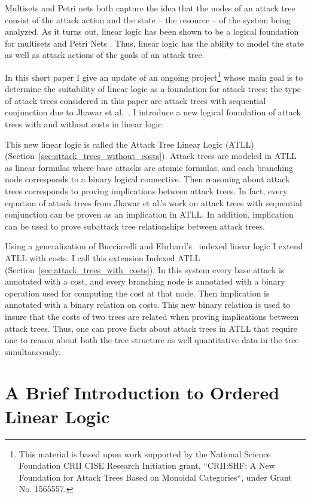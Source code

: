 \documentclass{llncs}
\begin{document}
Multisets and Petri nets both capture the idea that the nodes of an
attack tree consist of the attack action and the state -- the
resource -- of the system being analyzed. As it turns out, linear
logic has been shown to be a logical foundation for multisets
\cite{Tzouvaras:1998} and Petri Nets \cite{Brown:1991}.  Thus, linear
logic has the ability to model the state as well as attack actions of
the goals of an attack tree.  

In this short paper I give an update of an ongoing
project\footnote{This material is based upon work supported by the
  National Science Foundation CRII CISE Research Initiation grant,
  ``CRII:SHF: A New Foundation for Attack Trees Based on Monoidal
  Categories``, under Grant No. 1565557.} whose main goal is to
determine the suitability of linear logic as a foundation for attack
trees; the type of attack trees considered in this paper are attack
trees with sequential conjunction due to Jhawar et
al.~\cite{Jhawar:2015}.  I introduce a new logical foundation of
attack trees with and without costs in linear logic.

This new linear logic is called the Attack Tree Linear Logic (ATLL)
(Section~\ref{sec:attack_trees_without_costs}).  Attack trees are
modeled in ATLL as linear formulas where base attacks are atomic
formulas, and each branching node corresponds to a binary logical
connective. Then reasoning about attack trees corresponds to proving
implications between attack trees.  In fact, every equation of attack
trees from Jhawar et al.'s work on attack trees with sequential
conjunction \cite{Jhawar:2015} can be proven as an implication in
ATLL.  In addition, implication can be used to prove subattack tree
relationships between attack trees.

Using a generalization of Bucciarelli and
Ehrhard’s~\cite{BUCCIARELLI:2000} indexed linear logic I extend ATLL
with costs.  I call this extension Indexed ATLL
(Section~\ref{sec:attack_trees_with_costs}).  In this system every
base attack is annotated with a cost, and every branching node is
annotated with a binary operation used for computing the cost at that
node.  Then implication is annotated with a binary relation on costs.
This new binary relation is used to insure that the costs of two trees
are related when proving implications between attack trees.  Thus, one
can prove facts about attack trees in ATLL that require one to reason
about both the tree structure as well quantitative data in the tree
simultaneously.

\section{A Brief Introduction to Ordered Linear Logic}
\label{sec:a_brief_introduction_to_ordered_linear_logic}

\end{document}
